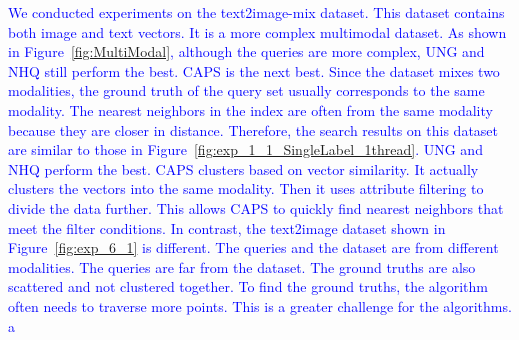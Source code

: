 \documentclass[sigconf, nonacm]{acmart}
\begin{document}
\textcolor{blue}{
	We conducted experiments on the text2image-mix dataset. This dataset contains both image and text vectors. It is a more complex multimodal dataset. As shown in Figure~\ref{fig:MultiModal}, although the queries are more complex, UNG and NHQ still perform the best. CAPS is the next best.
	Since the dataset mixes two modalities, the ground truth of the query set usually corresponds to the same modality. The nearest neighbors in the index are often from the same modality because they are closer in distance. Therefore, the search results on this dataset are similar to those in Figure~\ref{fig:exp_1_1_SingleLabel_1thread}. UNG and NHQ perform the best. CAPS clusters based on vector similarity. It actually clusters the vectors into the same modality. Then it uses attribute filtering to divide the data further. This allows CAPS to quickly find nearest neighbors that meet the filter conditions.
	In contrast, the text2image dataset shown in Figure~\ref{fig:exp_6_1} is different. The queries and the dataset are from different modalities. The queries are far from the dataset. The ground truths are also scattered and not clustered together. To find the ground truths, the algorithm often needs to traverse more points. This is a greater challenge for the algorithms.
a}
	
\end{document}
